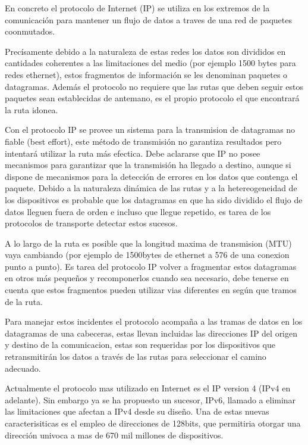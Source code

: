 \documentclass[a4paper,spanish,12pt]{book}
\begin{document}
En concreto el protocolo de Internet (IP) se utiliza en los extremos de la comunicación para mantener un flujo de datos a traves de una red de paquetes coonmutados.

Precísamente debido a la naturaleza de estas redes los datos son divididos en cantidades coherentes a las limitaciones del medio (por ejemplo 1500 bytes para redes ethernet), estos fragmentos de información se les denominan paquetes o datagramas. Además el protocolo no requiere que las rutas que deben seguir estos paquetes sean establecidas de antemano, es el propio protocolo el que encontrará la ruta idonea.

Con el protocolo IP se provee un sistema para la transmision de datagramas no fiable (best effort), este m\'etodo de transmisión no garantiza resultados pero intentará utilizar la ruta más efectica. Debe aclararse que IP no posee mecanismos para garantizar que la transmisión ha llegado a destino, aunque si dispone de mecanismos para la detección de errores en los datos que contenga el paquete. Debido a la naturaleza dinámica de las rutas y a la hetereogeneidad de los dispositivos es probable que los datagramas en que ha sido dividido el flujo de datos lleguen fuera de orden e incluso que llegue repetido, es tarea de los protocolos de transporte detectar estos sucesos.

A lo largo de la ruta es posible que la longitud maxima de transmision (MTU) vaya cambiando (por ejemplo de 1500bytes de ethernet a 576 de una conexion punto a punto). Es tarea del protocolo IP volver a fragmentar estos datagramas en otros más pequeños y recomponerlos cuando sea necesario, debe tenerse en cuenta que estos fragmentos pueden utilizar vias diferentes en según que tramos de la ruta.

Para manejar estos incidentes el protocolo acompaña a las tramas de datos en los datagramas de una cabeceras, estas llevan incluidas las direcciones IP del origen y destino de la comunicacion, estas son requeridas por los dispositivos que retransmitirán los datos a trav\'es de las rutas para seleccionar el camino adecuado.

Actualmente el protocolo mas utilizado en Internet es el IP version 4 (IPv4 en adelante). Sin embargo ya se ha propuesto un sucesor, IPv6, llamado a eliminar las limitaciones que afectan a IPv4 desde su diseño. Una de estas nuevas caracterisiticas es el empleo de direcciones de 128bits, que permitiria otorgar una dirección univoca a mas de 670 mil millones de dispositivos. 
\end{document}
